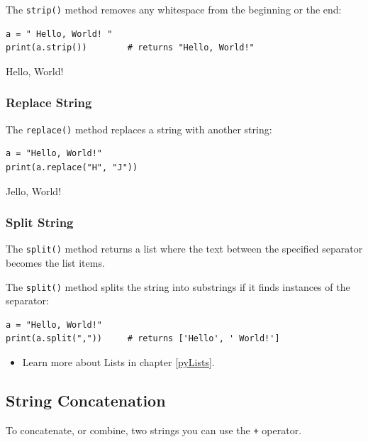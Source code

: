 \documentclass[12pt,a4paper]{article}
\newcommand{\code}[1]{%
	\colorbox{backcolour}{\lstinline{#1}}%
}
\begin{document}
\begin{ebox}
The \code{strip()} method removes any whitespace from the beginning or the end:

	\begin{lstlisting}
a = " Hello, World! "
print(a.strip())		# returns "Hello, World!"
	\end{lstlisting}
\tcblower
	\begin{vercode}
Hello, World!
	\end{vercode}
\end{ebox}
\subsubsection{Replace String}

\begin{ebox}
The \code{replace()} method replaces a string with another string:

	\begin{lstlisting}
a = "Hello, World!"
print(a.replace("H", "J"))
	\end{lstlisting}
\tcblower
	\begin{vercode}
Jello, World!
	\end{vercode}
\end{ebox}
\subsubsection{Split String}

The \code{split()} method returns a list where the text between the specified
separator becomes the list items.

\begin{ebox}
The \code{split()} method splits the string into substrings if it finds instances of the separator:

	\begin{lstlisting}
a = "Hello, World!"
print(a.split(","))     # returns ['Hello', ' World!']
	\end{lstlisting}
\tcblower
	\begin{vercode}
	\end{vercode}
\end{ebox}

\begin{itemize}
	\item Learn more about Lists in chapter \ref{pyLists}.
\end{itemize}
\subsection{String Concatenation}
To concatenate, or combine, two strings you can use the \code{+} operator.
\end{document}

